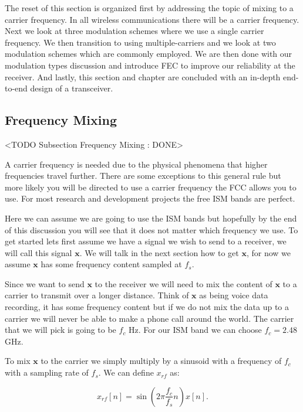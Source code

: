 The reset of this section is organized first by addressing the topic of mixing to a carrier frequency. In all wireless communications there will be a carrier frequency. Next we look at three modulation schemes where we use a single carrier frequency. We then transition to using multiple-carriers and we look at two modulation schemes which are commonly employed. We are then done with our modulation types discussion and introduce \ac{FEC} to improve our reliability at the receiver. And lastly, this section and chapter are concluded with an in-depth end-to-end design of a transceiver.

\subsection{Frequency Mixing} 
	<TODO Subsection Frequency Mixing : DONE>	
	
A carrier frequency is needed due to the physical phenomena that higher frequencies travel further. There are some exceptions to this general rule but more likely you will be directed to use a carrier frequency the \ac{FCC} allows you to use. For most research and development projects the free \ac{ISM} bands are perfect.

Here we can assume we are going to use the \ac{ISM} bands but hopefully by the end of this discussion you will see that it does not matter which frequency we use. To get started lets first assume we have a signal we wish to send to a receiver, we will call this signal $\mathbf{x}$. We will talk in the next section how to get $\mathbf{x}$, for now we assume $\mathbf{x}$ has some frequency content sampled at $f_s$.

Since we want to send $\mathbf{x}$ to the receiver we will need to mix the content of $\mathbf{x}$ to a carrier to transmit over a longer distance. Think of $\mathbf{x}$ as being voice data recording, it has some frequency content but if we do not mix the data up to a carrier we will never be able to make a phone call around the world. The carrier that we will pick is going to be $f_c$ \ac{Hz}. For our \ac{ISM} band we can choose $f_c = 2.48$ \ac{GHz}.

To mix $\mathbf{x}$ to the carrier we simply multiply by a sinusoid with a frequency of $f_c$ with a sampling rate of $f_s$. We can define $x_{rf}$ as:

\begin{equation}
\label{eq:mix}
x_{rf}[n] = \sin\left(2\pi\frac{f_c}{f_s}n\right)x[n].
\end{equation}	

